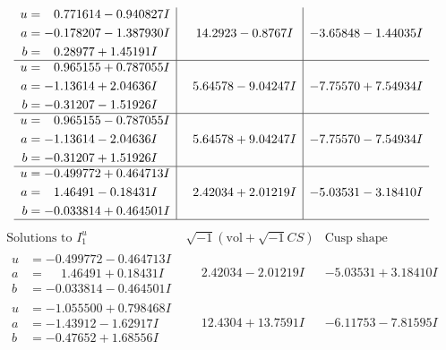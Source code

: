 \documentclass[1p]{elsarticle_modified}
\theoremstyle{definition}
\newcommand{\I}{\sqrt{-1}}
\begin{document}
$$\begin{array}{c|c|c}
\begin{aligned}
u &= \phantom{-}0.771614 - 0.940827 I \\
a &= -0.178207 - 1.387930 I \\
b &= \phantom{-}0.28977 + 1.45191 I\end{aligned}
 & \phantom{-}14.2923 - 0.8767 I & -3.65848 - 1.44035 I \\ \hline\begin{aligned}
u &= \phantom{-}0.965155 + 0.787055 I \\
a &= -1.13614 + 2.04636 I \\
b &= -0.31207 - 1.51926 I\end{aligned}
 & \phantom{-}5.64578 - 9.04247 I & -7.75570 + 7.54934 I \\ \hline\begin{aligned}
u &= \phantom{-}0.965155 - 0.787055 I \\
a &= -1.13614 - 2.04636 I \\
b &= -0.31207 + 1.51926 I\end{aligned}
 & \phantom{-}5.64578 + 9.04247 I & -7.75570 - 7.54934 I \\ \hline\begin{aligned}
u &= -0.499772 + 0.464713 I \\
a &= \phantom{-}1.46491 - 0.18431 I \\
b &= -0.033814 + 0.464501 I\end{aligned}
 & \phantom{-}2.42034 + 2.01219 I & -5.03531 - 3.18410 I\\
 \hline 
 \end{array}$$\newpage$$\begin{array}{c|c|c}  
\text{Solutions to }I^u_{1}& \I (\text{vol} + \sqrt{-1}CS) & \text{Cusp shape}\\
 \hline 
\begin{aligned}
u &= -0.499772 - 0.464713 I \\
a &= \phantom{-}1.46491 + 0.18431 I \\
b &= -0.033814 - 0.464501 I\end{aligned}
 & \phantom{-}2.42034 - 2.01219 I & -5.03531 + 3.18410 I \\ \hline\begin{aligned}
u &= -1.055500 + 0.798468 I \\
a &= -1.43912 - 1.62917 I \\
b &= -0.47652 + 1.68556 I\end{aligned}
 & \phantom{-}12.4304 + 13.7591 I & -6.11753 - 7.81595 I \\ \hline\begin{aligned}

\end{aligned}
\end{array}$$
\end{document}
